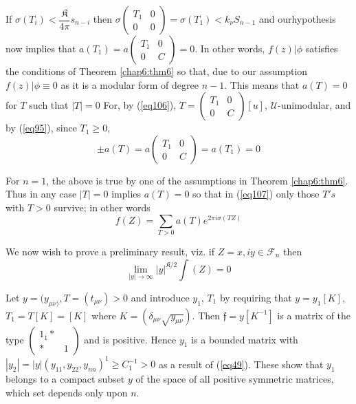 If $\sigma (T_i) < \dfrac{\mathfrak{K}} { 4 \pi } s_{n-i}$ then 
$\sigma \begin{pmatrix}
T_1 & 0\\
0 & 0 
\end{pmatrix} =  \sigma (T_1) < k_\nu S_{n-1}$
and our\pageoriginale hypothesis now implies that $a(T_1) = a   
\begin{pmatrix}
T_1  & 0 \\
0 & C
\end{pmatrix}
= 0$. In other words, $f (z)| \phi$ satisfies the conditions of
Theorem \ref{chap6:thm6} so that, due to our assumption $f (z) | \phi
\equiv 0$ as it 
is a modular form of degree $n-1$. This means that $a(T) = 0$ for $T$
such that $|T| = 0$ For, by (\ref{eq106}), $T = \begin{pmatrix} 
T_1  & 0 \\
0 & C
\end{pmatrix} [u]$, $\mathcal{U}$-unimodular, and by (\ref{eq95}), since
$T_1 \geq 0$, 
\begin{equation*}
\pm a (T) = a
\begin{pmatrix}
T_1  & 0 \\
0 & C
\end{pmatrix} = 
a(T_1) = 0 \tag{108}\label{eq108}
\end{equation*}

For $n =1$, the above is true by one of the assumptions in Theorem
\ref{chap6:thm6}. Thus in any case $|T| = 0$ implies $a (T) =0$ so
that in (\ref{eq107}) only those $T's$ with $T > 0$ survive; in other
words   
$$
f (Z) = \sum_{T > 0} a (T) e^{2 \pi i \sigma (TZ)}
$$

We now wish to prove a preliminary result, viz. if $Z =x, i y \in
\mathscr{F}_n$ then  
\begin{equation*}
\lim_{| y | \to \infty} | y |^{\mathfrak{K}/2} \int (Z) = 0
\tag{109}\label{eq109} 
\end{equation*}

Let $y = (y_{\mu \nu)}, T= (t_{\mu \nu}) > 0$ and introduce $y_1$, $T_1$
by requiring that $y = y_1 [K]$, $T_1 = T[K] = [K]$ where $K=
(\delta_{\mu \nu } \sqrt{y_{\mu \nu}})$. Then $\mathfrak{f} = y
[K^{-1}]$ is a matrix of the 
type $\begin{pmatrix} 1_1 * & \\ * & 1 \end{pmatrix}$ and is
positive. Hence $y_1$ is a bounded matrix with $|y_2|= |y|(y_{11},
y_{22},y_{nn})^1 \geq C^{-1}_1 > 0$ as a result of (\ref{eq49}). These show
that $y_1$ belongs to a compact subset $y$ of the space of all
positive symmetric matrices, which set depends only upon $n$. 

